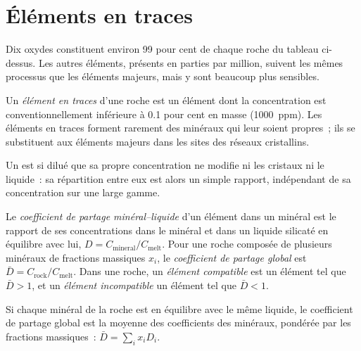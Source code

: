 \section{Éléments en traces}

Dix oxydes constituent environ 99 pour cent de chaque roche du tableau
ci-dessus. Les autres éléments, présents en parties par million, suivent les mêmes
processus que les éléments majeurs, mais y sont beaucoup plus sensibles.

\begin{definition}\label{def:b2:elements-in-the-earth:trace}
Un \emph{élément en traces} d'une roche est un élément dont
la concentration est conventionnellement inférieure à 0.1 pour cent en masse
(\qty{1000}{ppm}). Les éléments en traces forment rarement des minéraux qui leur soient propres~;
ils se substituent aux éléments majeurs dans les sites des réseaux cristallins.
\end{definition}

Un  est si dilué que sa propre concentration ne modifie
ni les cristaux ni le liquide~: sa répartition entre eux est alors un
simple rapport, indépendant de sa concentration sur une large gamme.

\begin{definition}\label{def:b2:elements-in-the-earth:partition}
Le \emph{coefficient de partage minéral--liquide}
d'un élément dans un minéral est le rapport de ses concentrations
dans le minéral et dans un liquide silicaté en équilibre avec lui,
$D = C_{\mathrm{mineral}}/C_{\mathrm{melt}}$. Pour une roche composée de plusieurs minéraux de
fractions massiques $x_i$, le \emph{coefficient de partage global} est
$\bar D = C_{\mathrm{rock}}/C_{\mathrm{melt}}$. Dans une roche, un
\emph{élément compatible} est un élément tel que $\bar D > 1$, et un
\emph{élément incompatible} un élément tel que $\bar D < 1$.
\end{definition}

\begin{proposition}
\label{prop:b2:elements-in-the-earth:bulk-d}
Si chaque minéral de la roche est en équilibre avec le même liquide, le
coefficient de partage global est la moyenne des coefficients des
minéraux, pondérée par les fractions massiques~: $\bar D = \sum_i x_i D_i$.
\end{proposition}

